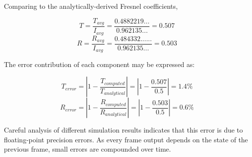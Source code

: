 Comparing to the analytically-derived Fresnel coefficients,

\begin{equation}
T = \frac{T_{avg}}{I_{avg}} = \frac{0.4882219...}{0.962135...} = 0.507
\end{equation}
\begin{equation}
R = \frac{R_{avg}}{I_{avg}} = \frac{0.484332......}{0.962135...} = 0.503
\end{equation}

The error contribution of each component may be expressed as:

\begin{equation}
T_{error} = |1 - \frac{T_{computed}}{T_{analytical}}| = |1 - \frac{0.507}{0.5}| = 1.4\%
\end{equation}
\begin{equation}
R_{error} = |1 - \frac{R_{computed}}{R_{analytical}}| = |1 - \frac{0.503}{0.5}| = 0.6\%
\end{equation}

Careful analysis of different simulation results indicates that this error is due to floating-point precision errors. As every frame output depends on the state of the previous frame, small errors are compounded over time. 




